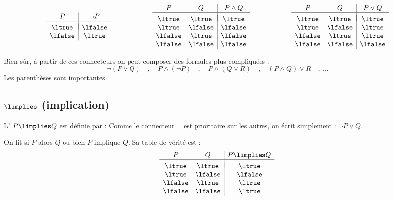 \documentclass[11pt,class=report,crop=false]{standalone}
\begin{document}
\[
\begin{array}{c | c}
P		& \lnot P \\
\hline
&	\\[-2ex]
\ltrue 	& \lfalse \\
\lfalse & \ltrue \\
\end{array}
\qquad\qquad\qquad
\begin{array}{c c | c}
	P		& Q 		& P \land Q \\
	\hline
	&&	\\[-2ex]
	\ltrue 	& \ltrue 	& \ltrue \\
	\ltrue 	& \lfalse 	& \lfalse \\
	\lfalse & \ltrue 	& \lfalse \\	
	\lfalse & \lfalse 	& \lfalse \\		
\end{array}
\qquad\qquad\qquad
\begin{array}{c c | c}
	P		& Q 		& P \lor Q \\
	\hline
	&&	\\[-2ex]
	\ltrue 	& \ltrue 	& \ltrue \\
	\ltrue 	& \lfalse 	& \ltrue \\
	\lfalse & \ltrue 	& \ltrue \\	
	\lfalse & \lfalse 	& \lfalse \\		
\end{array}
\]


Bien sûr, à partir de ces connecteurs on peut composer des formules plus compliquées :
\[
\lnot(P \lor Q)\quad , \quad 
P \land (\lnot P)\quad , \quad 
P \land (Q \lor R)\quad , \quad 
(P \land Q) \lor R\quad , \ \ldots
\]
Les parenthèses sont importantes.


\subsection{$\limplies$ (implication)}

L' $P \limplies Q$ est définie par :
 Comme le connecteur $\lnot$ est prioritaire sur les autres, on écrit simplement : $\lnot P \lor Q$.

On lit \og{}si $P$ alors $Q$\fg{} ou bien \og{}$P$ implique $Q$\fg{}.
Sa table de vérité est :
\[
\begin{array}{c c | c}
	P		& Q 		& P \limplies Q \\
	\hline
	&&	\\[-2ex]
	\ltrue 	& \ltrue 	& \ltrue \\
	\ltrue 	& \lfalse 	& \lfalse \\
	\lfalse & \ltrue 	& \ltrue \\	
	\lfalse & \lfalse 	& \ltrue \\		
\end{array}
\]
\end{document}

